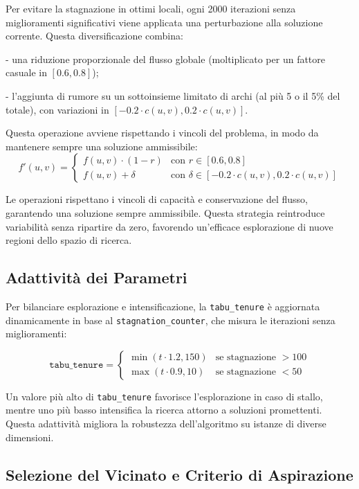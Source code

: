 \documentclass[12pt,a4paper]{article}
\begin{document}
Per evitare la stagnazione in ottimi locali, ogni 2000 iterazioni senza miglioramenti significativi viene applicata una perturbazione alla soluzione corrente. Questa diversificazione combina:

    
- una riduzione proporzionale del flusso globale (moltiplicato per un fattore casuale in $[0.6, 0.8]$);
    
- l’aggiunta di rumore su un sottoinsieme limitato di archi (al più 5 o il 5\% del totale), con variazioni in $[-0.2 \cdot c(u,v), 0.2 \cdot c(u,v)]$.

Questa operazione avviene rispettando i vincoli del problema, in modo da mantenere sempre una soluzione ammissibile:
\[
f'(u,v) = 
\begin{cases} 
f(u,v) \cdot (1 - r) & \text{con } r \in [0.6, 0.8] \\
f(u,v) + \delta & \text{con } \delta \in [-0.2 \cdot c(u,v), 0.2 \cdot c(u,v)]
\end{cases}
\]

Le operazioni rispettano i vincoli di capacità e conservazione del flusso, garantendo una soluzione sempre ammissibile. Questa strategia reintroduce variabilità senza ripartire da zero, favorendo un’efficace esplorazione di nuove regioni dello spazio di ricerca.

\subsection{Adattività dei Parametri}

Per bilanciare esplorazione e intensificazione, la \texttt{tabu\_tenure} è aggiornata dinamicamente in base al \texttt{stagnation\_counter}, che misura le iterazioni senza miglioramenti:

\[
\texttt{tabu\_tenure} = 
\begin{cases} 
\min(t \cdot 1.2, 150) & \text{se stagnazione } > 100 \\
\max(t \cdot 0.9, 10)  & \text{se stagnazione } < 50
\end{cases}
\]

Un valore più alto di \texttt{tabu\_tenure} favorisce l’esplorazione in caso di stallo, mentre uno più basso intensifica la ricerca attorno a soluzioni promettenti. Questa adattività migliora la robustezza dell’algoritmo su istanze di diverse dimensioni.

\subsection{Selezione del Vicinato e Criterio di Aspirazione}
\end{document}
